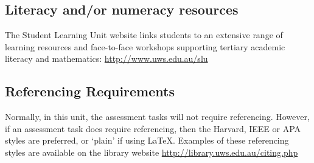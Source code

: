 \documentclass[a4paper,oneside]{book}
\begin{document}
\subsection*{Literacy and/or numeracy resources}

The Student Learning Unit website links students to an extensive range
of learning resources and face-to-face workshops supporting tertiary
academic literacy and mathematics: \url{http://www.uws.edu.au/slu}

\subsection*{Referencing Requirements}

Normally, in this unit, the assessment tasks will not require
referencing.  However, if an assessment task does require referencing,
then the Harvard, IEEE or APA styles are preferred, or `plain' if
using LaTeX.  Examples of these referencing styles are available on
the library website \url{http://library.uws.edu.au/citing.php}
\end{document}
